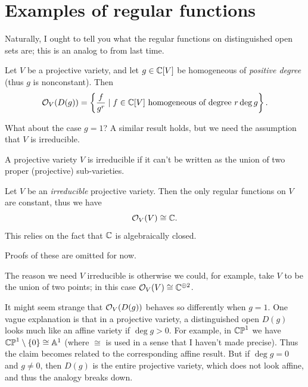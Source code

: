 \section{Examples of regular functions}
Naturally, I ought to tell you what the regular functions
on distinguished open sets are; this is an analog to
 from last time.
\begin{theorem}
	\label{thm:proj_reg_func_dist_open}
	Let $V$ be a projective variety, and let $g \in \mathbb C[V]$ be homogeneous
	of \emph{positive degree} (thus $g$ is nonconstant).
	Then
	\[
		\mathcal O_V(D(g))
		= \left\{ \frac{f}{g^r} \mid
		f \in \mathbb C[V] \text{ homogeneous of degree $r\deg g$}
		\right\}.
	\]
\end{theorem}
What about the case $g = 1$?
A similar result holds, but we need the assumption that $V$ is irreducible.
\begin{definition}
	A projective variety $V$ is irreducible
	if it can't be written as the union of two proper (projective) sub-varieties.
\end{definition}
\begin{theorem}
	Let $V$ be an \emph{irreducible} projective variety.
	Then the only regular functions on $V$ are constant,
	thus we have \[ \mathcal O_V(V) \cong \mathbb C. \]
	This relies on the fact that $\mathbb C$ is algebraically closed.
\end{theorem}
Proofs of these are omitted for now.
\begin{example}
	The reason we need $V$ irreducible is otherwise
	we could, for example, take $V$ to be the union of two points;
	in this case $\mathcal O_V(V) \cong \mathbb C^{\oplus 2}$.
\end{example}

\begin{remark}
	It might seem strange that $\mathcal O_V(D(g))$ behaves so differently
	when $g = 1$. One vague explanation is that in a projective variety,
	a distinguished open $D(g)$ looks much like an affine variety if $\deg g > 0$.
	For example, in $\mathbb{CP}^1$ we have $\mathbb{CP}^1 \setminus \{0\} \cong \mathbb A^1$
	(where $\cong$ is used in a sense that I haven't made precise).
	Thus the claim becomes related to the corresponding affine result.
	But if $\deg g = 0$ and $g \neq 0$, then $D(g)$ is the entire projective variety,
	which does not look affine, and thus the analogy breaks down.
\end{remark}

